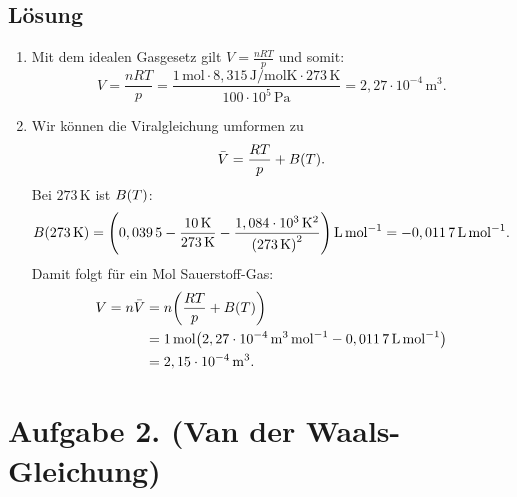 \documentclass[german,12pt]{homework}
\DeclarePairedDelimiter{\enbrace}{(}{)}
\newcommand{\sis}[1]{\,\si{#1}}
\begin{document}
    \subsection*{Lösung}
    \begin{enumerate}
        \item Mit dem idealen Gasgesetz gilt \(V = \frac{nRT}{p}\) und somit:
        \[V = \frac{nRT}{p} = \frac{1\sis{\mole} \cdot 8,315\sis{\joule\per\mole\kelvin} \cdot 273\sis{\kelvin}}{100 \cdot 10^5\sis{\pascal}} = 2,27 \cdot 10^{-4}\sis{\meter\cubed}.\]
        \item Wir können die Viralgleichung umformen zu
        \[\bar{V} = \frac{RT}{p} + B\enbrace*{T}.\]
        Bei \(273\sis{\kelvin}\) ist \(B\enbrace*{T}\):
        \[B\enbrace*{273\sis{\kelvin}} = \enbrace*{0,039\,5 -
        \frac{10\sis{\kelvin}}{273\sis{\kelvin}} - \frac{1,084 \cdot 10^3
        \sis{\kelvin\squared}}{\enbrace*{273\sis{\kelvin}}^2}}
        \sis{\liter\per\mole} = -0,011\,7\sis{\liter\per\mole}.\]
        Damit folgt für ein Mol Sauerstoff-Gas:
        \begin{align*}
            V = n\bar{V} &= n\enbrace*{\frac{RT}{p} + B\enbrace*{T}}\\
            &= 1\sis{\mole}\enbrace*{2,27 \cdot 10^{-4}
            \sis{\meter\cubed\per\mole} - 0,011\,7\sis{\liter\per\mole}}\\
            &= 2,15 \cdot 10^{-4}\sis{\meter\cubed}.
        \end{align*}
    \end{enumerate}

    \section*{Aufgabe 2. (Van der Waals-Gleichung)}
\end{document}
